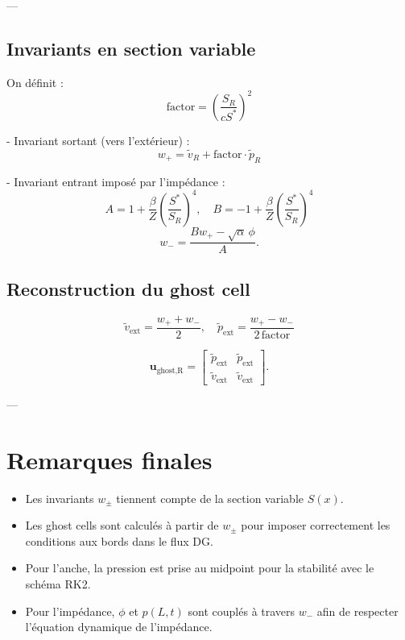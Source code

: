 \documentclass[12pt,a4paper]{article}
\begin{document}
---

\subsection{Invariants en section variable}

On définit :
\[
\text{factor} = \left(\frac{S_R}{c S^*}\right)^2
\]

- Invariant sortant (vers l'extérieur) :
\[
w_+ = \tilde{v}_R + \text{factor} \cdot \tilde{p}_R
\]

- Invariant entrant imposé par l'impédance :
\[
A = 1 + \frac{\beta}{Z} \left(\frac{S^*}{S_R}\right)^4, \quad
B = -1 + \frac{\beta}{Z} \left(\frac{S^*}{S_R}\right)^4
\]
\[
w_- = \frac{B w_+ - \sqrt{\alpha} \, \phi}{A}.
\]

\subsection{Reconstruction du ghost cell}

\[
\tilde{v}_{\text{ext}} = \frac{w_+ + w_-}{2}, \quad
\tilde{p}_{\text{ext}} = \frac{w_+ - w_-}{2 \, \text{factor}}
\]

\[
\mathbf{u}_{\text{ghost,R}} =
\begin{bmatrix}
\tilde{p}_{\text{ext}} & \tilde{p}_{\text{ext}} \\
\tilde{v}_{\text{ext}} & \tilde{v}_{\text{ext}}
\end{bmatrix}.
\]

---

\section{Remarques finales}

\begin{itemize}
    \item Les invariants \(w_\pm\) tiennent compte de la section variable \(S(x)\).
    \item Les ghost cells sont calculés à partir de \(w_\pm\) pour imposer correctement les conditions aux bords dans le flux DG.
    \item Pour l'anche, la pression est prise au midpoint pour la stabilité avec le schéma RK2.
    \item Pour l'impédance, \(\phi\) et \(p(L,t)\) sont couplés à travers \(w_-\) afin de respecter l'équation dynamique de l'impédance.
\end{itemize}
\end{document}
